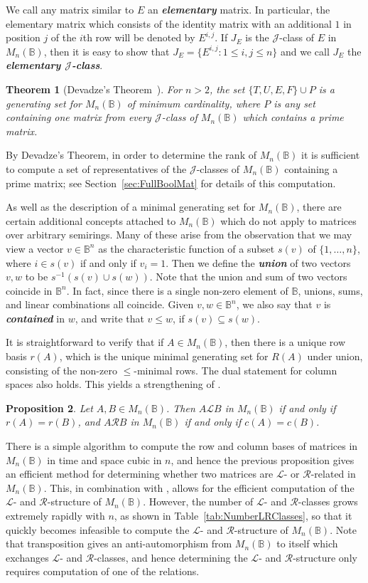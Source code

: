 \documentclass[11pt]{article}
\newtheorem{thm}{Theorem}[subsection]
\newtheorem{prop}[thm]{Proposition}
\newcommand{\defn}[1]{\textbf{\textit{#1}}}
\numberwithin{equation}{section}
\newcommand{\set}[2]{\ensuremath{\{#1 : #2 \}}}
\newcommand{\B}{\mathbb{B}}
\newcommand{\Bn}{M_n(\B)}
\renewcommand{\L}{\mathscr{L}}
\newcommand{\R}{\mathscr{R}}
\newcommand{\J}{\mathscr{J}}
\begin{document}
We call any matrix similar to $E$ an \defn{elementary} matrix. In particular,
the elementary matrix which consists of the identity matrix with an additional
$1$ in position $j$ of the $i$th row will be denoted by $E^{i,j}$. If $J_E$ is
the $\J$-class of $E$ in $\Bn$, then it is easy to show that $J_E =
\set{E^{i,j}}{1 \leq i, j \leq n}$ and we call $J_E$ the \defn{elementary
  $\J$-class}. 
\begin{thm}[Devadze's Theorem~\cite{Konieczny2011aa}]
  For $n > 2$, the set $\{T, U, E, F\} \cup P$ is a generating set for $\Bn$ of
  minimum cardinality, where $P$ is any set containing one matrix from every
  $\J$-class of $\Bn$ which contains a prime matrix. 
\end{thm}
By Devadze's Theorem, in order to determine the rank of $\Bn$ it is sufficient
to compute a set of representatives of the $\J$-classes of $\Bn$ containing a
prime matrix; see Section~\ref{sec:FullBoolMat} for details of this computation.

As well as the description of a minimal generating set for $\Bn$, there are
certain additional concepts attached to $\Bn$ which do not apply to matrices
over arbitrary semirings. Many of these arise from the observation that we may
view a vector $v \in \B^n$ as the characteristic function of a subset $s(v)$ of
$\{1, \ldots, n\}$, where $i \in s(v)$ if and only if $v_i = 1$.  Then we define
the \defn{union} of two vectors $v, w$ to be $s^{-1}(s(v) \cup s(w))$. Note that
the union and sum of two vectors coincide in $\B^n$. In fact, since there is a
single non-zero element of $\B$, unions, sums, and linear combinations all
coincide. Given $v, w \in \B^n$, we also say that $v$ is \defn{contained} in
$w$, and write that $v \leq w$, if $s(v) \subseteq s(w)$.

It is straightforward to verify that if $A \in \Bn$, then there is a unique row
basis $r(A)$, which is the unique minimal generating set for $R(A)$ under union,
consisting of the non-zero $\leq$-minimal rows. The dual statement for column
spaces also holds. This yields a strengthening of
.

\begin{prop} 
  Let $A, B \in \Bn$. Then $A \L B$ in $\Bn$ if and only if $r(A) = r(B)$,
  and $A \R B$ in $\Bn$ if and only if $c(A) = c(B)$.
\end{prop}
There is a simple algorithm to compute the row and column bases of matrices in
$\Bn$ in time and space cubic in $n$, and hence the previous proposition gives
an efficient method for determining whether two matrices are $\L$- or
$\R$-related in $\Bn$. This, in combination with
, allows for the efficient computation of the
$\L$- and $\R$-structure of $\Bn$. However, the number of $\L$- and $\R$-classes
grows extremely rapidly with $n$, as shown in Table~\ref{tab:NumberLRClasses},
so that it quickly becomes infeasible to compute the $\L$- and $\R$-structure of
$\Bn$. Note that transposition gives an anti-automorphism from $\Bn$ to itself
which exchanges $\L$- and $\R$-classes, and hence determining the $\L$- and
$\R$-structure only requires computation of one of the relations.
\end{document}
